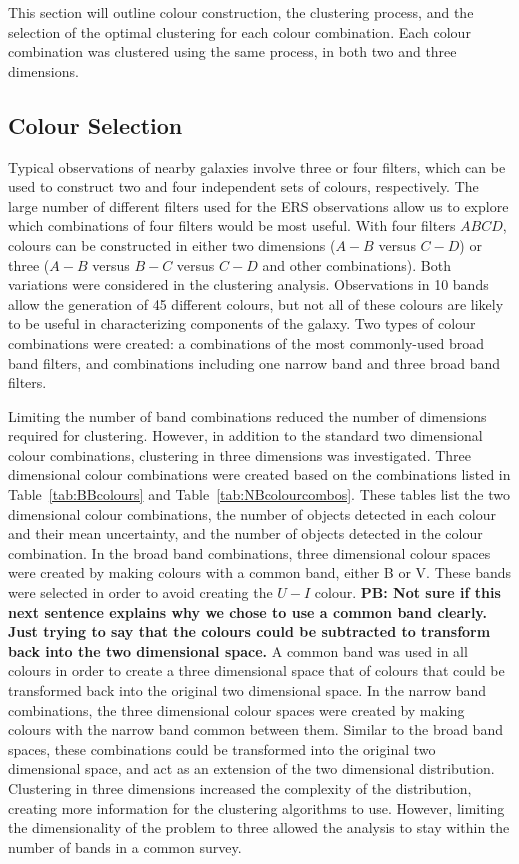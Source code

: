 This section will outline colour construction, the clustering process, and the selection of the optimal clustering for each colour combination.
Each colour combination was clustered using the same process, in both two and three dimensions.

\subsection{Colour Selection}

Typical observations of nearby galaxies involve three or four filters, %
which can be used to construct two and four independent sets of colours, respectively.
The large number of different filters used for the ERS observations allow us to explore which combinations of four filters would be most useful.
With four filters $ABCD$, colours can be constructed in either two dimensions ($A-B$ versus $C-D$) or three ($A-B$ versus $B-C$ versus $C-D$ and other combinations).
Both variations were considered in the clustering analysis.
Observations in 10 bands allow the generation of 45 different colours, but not all of these colours are likely to be useful in characterizing components of the galaxy.
Two types of colour combinations were created: a combinations of the most commonly-used broad band filters, and combinations including one narrow band and three broad band filters.

Limiting the number of band combinations reduced the number of dimensions required for clustering.
However, in addition to the standard two dimensional colour combinations, clustering in three dimensions was investigated.
Three dimensional colour combinations were created based on the combinations listed in Table~\ref{tab:BBcolours} and Table~\ref{tab:NBcolourcombos}.
These tables list the two dimensional colour combinations, the number of objects detected in each colour and their mean uncertainty, and the number of objects detected in the colour combination.
In the broad band combinations, three dimensional colour spaces were created by making colours with a common band, either B or V.
These bands were selected in order to avoid creating the $U - I$ colour.
\textbf{PB: Not sure if this next sentence explains why we chose to use a common band clearly. Just trying to say that the colours could be subtracted to transform back into the two dimensional space.}
A common band was used in all colours in order to create a three dimensional space that of colours that could be transformed back into the original two dimensional space. 
In the narrow band combinations, the three dimensional colour spaces were created by making colours with the narrow band common between them.
Similar to the broad band spaces, these combinations could be transformed into the original two dimensional space, and act as an extension of the two dimensional distribution.
Clustering in three dimensions increased the complexity of the distribution, creating more information for the clustering algorithms to use.
However, limiting the dimensionality of the problem to three allowed the analysis to stay within the number of bands in a common survey.

